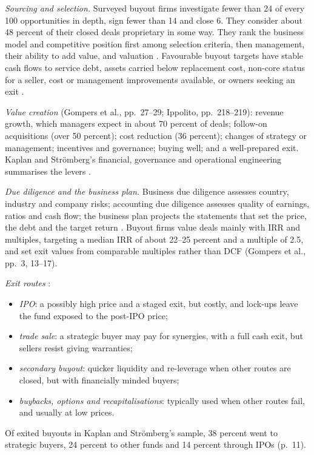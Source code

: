 \begin{qfmethod}\label{meth:private-deal-process-exits}
 \emph{Sourcing and selection.} Surveyed buyout firms investigate fewer than 24 of every 100 opportunities in depth, sign fewer than 14 and close 6. They consider about 48 percent of their closed deals proprietary in some way. They rank the business model and competitive position first among selection criteria, then management, their ability to add value, and valuation \citep[NBER WP 21133, pp.~25--26]{w5-gompers-kaplan-mukharlyamov}. Favourable buyout targets have stable cash flows to service debt, assets carried below replacement cost, non-core status for a seller, cost or management improvements available, or owners seeking an exit \citep[pp.~188--189]{ippolito-private-capital-2020}.

\emph{Value creation} (Gompers et al., pp.~27--29; Ippolito, pp.~218--219): revenue growth, which managers expect in about 70 percent of deals; follow-on acquisitions (over 50 percent); cost reduction (36 percent); changes of strategy or management; incentives and governance; buying well; and a well-prepared exit. Kaplan and Str\"omberg's financial, governance and operational engineering summarises the levers \citep[NBER WP 14207, pp.~13--16]{pe-kaplan-stromberg-2009}.

\emph{Due diligence and the business plan.} Business due diligence assesses country, industry and company risks; accounting due diligence assesses quality of earnings, ratios and cash flow; the business plan projects the statements that set the price, the debt and the target return \citep[pp.~71--94, 125--130]{ippolito-private-capital-2020}. Buyout firms value deals mainly with IRR and multiples, targeting a median IRR of about 22--25 percent and a multiple of 2.5, and set exit values from comparable multiples rather than DCF (Gompers et al., pp.~3, 13--17).

\emph{Exit routes} \citep[pp.~220--225]{ippolito-private-capital-2020}:
\begin{itemize}
\item \emph{IPO}: a possibly high price and a staged exit, but costly, and lock-ups leave the fund exposed to the post-IPO price;
\item \emph{trade sale}: a strategic buyer may pay for synergies, with a full cash exit, but sellers resist giving warranties;
\item \emph{secondary buyout}: quicker liquidity and re-leverage when other routes are closed, but with financially minded buyers;
\item \emph{buybacks, options and recapitalisations}: typically used when other routes fail, and usually at low prices.
\end{itemize}
Of exited buyouts in Kaplan and Str\"omberg's sample, 38 percent went to strategic buyers, 24 percent to other funds and 14 percent through IPOs (p.~11).


\end{qfmethod}
